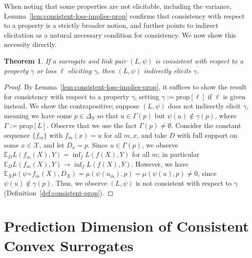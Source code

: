 \documentclass{article}
\newcommand{\Comments}{1}
\newcommand{\mynote}[2]{\ifnum\Comments=1\textcolor{#1}{#2}\fi}
\newcommand{\mytodo}[2]{\ifnum\Comments=1%
	\todo[linecolor=#1!80!black,backgroundcolor=#1,bordercolor=#1!80!black]{#2}\fi}
\newcommand{\raft}[1]{\mytodo{green!20!white}{RF: #1}}
\newcommand{\jessie}[1]{\mynote{purple}{[JF: #1]}}
\newcommand{\simplex}{\Delta_\Y}
\newcommand{\prop}[1]{\mathrm{prop}[#1]}
\newcommand{\propdis}{\mu}
\newcommand{\E}{\mathbb{E}}
\newcommand{\X}{\mathcal{X}}
\newcommand{\Y}{\mathcal{Y}}
\newtheorem{theorem}{Theorem}
\begin{document}
When noting that some properties are not elicitable, including the variance, Lemma~\ref{lem:consistent-loss-implies-prop} confirms that consistency with respect to a property is a strictly broader notion, and further points to indirect elicitation as a natural necessary condition for consistency.
We now show this necessity directly.

\begin{theorem}\label{thm:consistent-implies-indir-elic}
	If a surrogate and link pair $(L, \psi)$ is consistent with respect to a property $\gamma$ or loss $\ell$ eliciting $\gamma$, then $(L, \psi)$ indirectly elicits $\gamma$.
\end{theorem}
\begin{proof}
	By Lemma~\ref{lem:consistent-loss-implies-prop}, it suffices to show the result for consistency with respect to a property $\gamma$, setting $\gamma := \prop{\ell}$ if $\ell$ is given instead.
	We show the contrapositive; suppose $(L, \psi)$ does not indirectly elicit $\gamma$, meaning we have some $p \in \simplex$ so that $u \in \Gamma(p)$ but $\psi(u) \not \in \gamma(p)$, where $\Gamma := \prop{L}$.
	Observe that we use the fact $\Gamma(p) \neq \emptyset$.
	Consider the constant sequence $\{f_m\}$ with $f_m(x) = u$ for all $m,x$, and take $D$ with full support on some $x \in \X$, and let $D_x = p$.
  Since $u \in \Gamma(p)$, we observe $\E_D L(f_m(X), Y) = \inf_f L(f(X),Y)$ for all $m$; in particular $\E_D L(f_m(X), Y) \to \inf_f L(f(X),Y)$.
	However, we have $\E_X \propdis(\psi \circ f_m(X), D_X) = \propdis(\psi(u_m), p) = \propdis(\psi(u), p) \neq 0$, since $\psi(u) \not \in \gamma(p)$.
	Thus, we observe $(L, \psi)$ is not consistent with respect to $\gamma$ (Definition~\ref{def:consistent-prop}).
\end{proof}

\section{Prediction Dimension of Consistent Convex Surrogates}\label{sec:char-convex}
\end{document}
